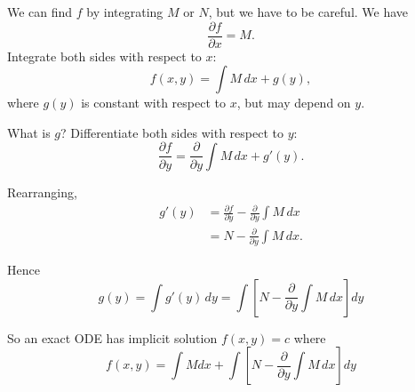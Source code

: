 We can find $f$ by integrating $M$ or $N$, but we have to be careful.  We have
  \[
    \frac{\partial f}{\partial x} = M.
  \]
Integrate both sides with respect to $x$:
  \[
    f(x, y) = \int M \, dx + g(y),
  \]
where $g(y)$ is constant with respect to $x$, but may depend on $y$.

What is $g$?  Differentiate both sides with respect to $y$:
  \[
    \frac{\partial f}{\partial y} = \frac{\partial}{\partial y}\int M \, dx + g'(y).
  \]

Rearranging,
  \begin{align*}
    g'(y) & = \frac{\partial f}{\partial y} - \frac{\partial}{\partial y}\int M \, dx  \\
     & = N - \frac{\partial}{\partial y}\int M \, dx.
  \end{align*}

Hence
  \[
    g(y) = \int g'(y) \, dy = \int \left[ N - \dfrac{\partial}{\partial y} \int M \, dx \right] dy
  \]

So an exact ODE has implicit solution $f(x,y)=c$ where
\[
 f(x,y) = \int Mdx + \int \left[
 N - \dfrac{\partial}{\partial y} \int M \, dx
 \right] dy
\]

